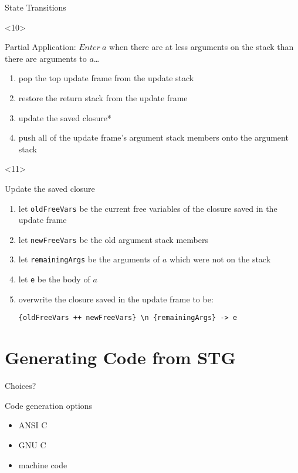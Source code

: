 \documentclass{beamer}
\begin{document}
\begin{frame}[fragile]{State Transitions}
  \begin{onlyenv}<10>
    \begin{block}{Partial Application: $Enter\ a$}
      when there are at less arguments on the stack than there are arguments to
      $a$\ldots
      \begin{enumerate}
      \item pop the top update frame from the update stack
      \item restore the return stack from the update frame
      \item update the saved closure*
      \item push all of the update frame's argument stack members onto the
        argument stack
      \end{enumerate}
    \end{block}
  \end{onlyenv}

  \begin{onlyenv}<11>
    \begin{block}{Update the saved closure}
      \begin{enumerate}
      \item let \texttt{oldFreeVars} be the current free variables of the
        closure saved in the update frame
      \item let \texttt{newFreeVars} be the old argument stack members
      \item let \texttt{remainingArgs} be the arguments of $a$ which were
        not on the stack
      \item let \texttt{e} be the body of $a$
      \item overwrite the closure saved in the update frame to be:
        \begin{verbatim}
{oldFreeVars ++ newFreeVars} \n {remainingArgs} -> e
        \end{verbatim}
      \end{enumerate}
    \end{block}
  \end{onlyenv}
\end{frame}

\section{Generating Code from STG}

\begin{frame}{Choices?}
  \begin{block}{Code generation options}
    \begin{itemize}
    \item ANSI C
    \item GNU C
    \item machine code
    \end{itemize}
  \end{block}
\end{frame}
\end{document}
